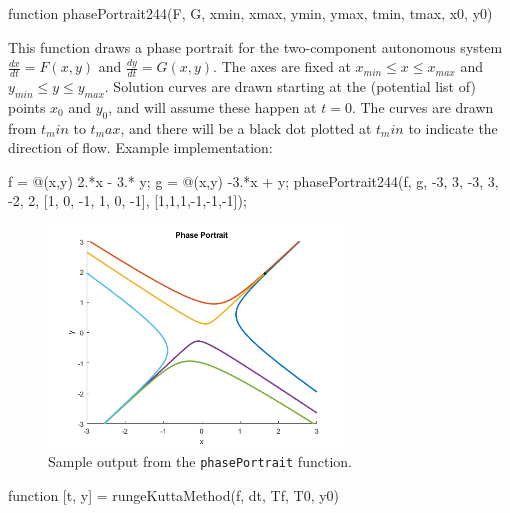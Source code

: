 \begin{matlab}
function phasePortrait244(F, G, xmin, xmax, ymin, ymax, tmin, tmax, x0, y0)
\end{matlab}

This function draws a phase portrait for the two-component autonomous system $\frac{dx}{dt} = F(x,y)$ and $\frac{dy}{dt} = G(x,y)$. The axes are fixed at $x_{min} \leq x \leq x_{max}$ and $y_{min} \leq y \leq y_{max}$. Solution curves are drawn starting at the (potential list of) points $x_0$ and $y_0$, and will assume these happen at $t=0$. The curves are drawn from $t_min$ to $t_max$, and there will be a black dot plotted at $t_min$ to indicate the direction of flow. Example implementation:

\begin{matlab}
f = @(x,y) 2.*x - 3.* y;
g = @(x,y) -3.*x + y;
phasePortrait244(f, g, -3, 3, -3, 3, -2, 2, [1, 0, -1, 1, 0, -1], [1,1,1,-1,-1,-1]);
\end{matlab}

\begin{figure}[h!]
    \centering
    \includegraphics[width=0.7\textwidth]{Images/MatlabDemo_phasePortrait.png}
    \caption{Sample output from the \texttt{phasePortrait} function.}
    \label{fig:MatlabDemo_phasePortrait}
\end{figure}

\begin{matlab}
function [t, y] = rungeKuttaMethod(f, dt, Tf, T0, y0)
\end{matlab}

